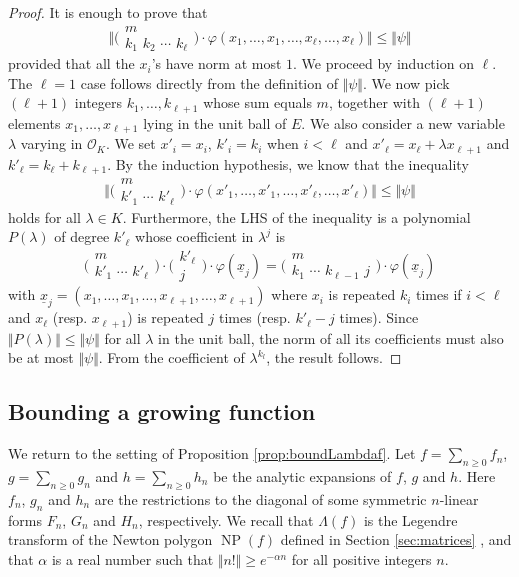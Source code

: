 \documentclass{sig-alternate}
\DeclareMathOperator{\NP}{NP}
\renewcommand{\O}{\mathcal O}
\def\binom#1#2{\Big(\begin{array}{cc} #1 \\ #2 \end{array}\Big)}
\begin{document}
\begin{proof}
It is enough to prove that
$$\Big\Vert \binom m {k_1 \,\, k_2 \,\, \cdots \,\, k_\ell} \cdot
\varphi(x_1, \ldots, x_1, \ldots, x_\ell, \ldots,
x_\ell) \Big\Vert \leq \Vert \psi \Vert$$
provided that all the $x_i$'s have norm at most $1$. We proceed by 
induction on 
$\ell$. The $\ell = 1$ case follows directly from
the definition of $\Vert \psi \Vert$. 
We now pick $(\ell+1)$ integers $k_1, \ldots, k_{\ell+1}$ whose sum 
equals $m$, together with $(\ell+1)$ elements $x_1, \ldots, x_{\ell+1}$
lying in the unit ball of $E$.
We also consider a new variable $\lambda$ varying in
$\O_K$. We set $x'_i = x_i$, $k'_i = k_i$ when $i < \ell$ and $x'_\ell 
= x_\ell + \lambda x_{\ell+1}$ and $k'_\ell = k_\ell + k_{\ell+1}$. By the 
induction hypothesis, we know that the inequality
$$\Big\Vert \binom m {k'_1 \,\, \cdots \,\, k'_\ell} \cdot
\varphi(x'_1, \ldots, x'_1, \ldots, x'_\ell, \ldots, x'_\ell) \Big\Vert
\leq \Vert \psi \Vert$$
holds for all $\lambda \in K$. Furthermore, the LHS of the inequality
is a polynomial $P(\lambda)$ of degree $k'_\ell$ whose coefficient in 
$\lambda^j$ is
$$\binom m {k'_1 \,\, \cdots \,\, k'_\ell} \cdot
\binom {k'_\ell} {j} \cdot
\varphi(\underline x_j) = 
\binom m {k_1 \,\, \cdots \,\, k_{\ell-1} \,\, j} \cdot
\varphi(\underline x_j)$$
with
$\underline x_j = (x_1, \ldots, x_1, \ldots, x_{\ell+1}, \ldots, 
x_{\ell+1})$
where $x_i$ is repeated $k_i$ times if $i < \ell$ and $x_\ell$ 
(resp. $x_{\ell+1}$) is repeated $j$ times (resp. $k'_\ell - j$ times).
Since $\Vert P(\lambda) \Vert \leq \Vert \psi \Vert$ for all $\lambda$ in 
the unit ball, the norm of all its coefficients must also be at most $\Vert \psi
\Vert$. From the coefficient of $\lambda^{k_l}$, the result follows.
\end{proof}

\subsection{Bounding a growing function}

We return to the setting of Proposition \ref{prop:boundLambdaf}.
Let $f = \sum_{n \geq 0} f_n$, $g = \sum_{n \geq 0} g_n$ and
$h = \sum_{n \geq 0} h_n$ be the analytic expansions of
$f$, $g$ and $h$.
Here $f_n$, $g_n$ and $h_n$ are the restrictions to the diagonal of 
some symmetric $n$-linear forms $F_n$, $G_n$ and $H_n$, respectively.
We recall that $\Lambda(f)$ 
is the Legendre transform of the Newton polygon $\NP(f)$ defined in Section \ref{sec:matrices}
\cite[Proposition 3.9]{caruso-roe-vaccon:14a}, and that $\alpha$ is a
real number such that $\Vert n! \Vert \geq e^{-\alpha n}$ for all positive integers $n$.
\end{document}
